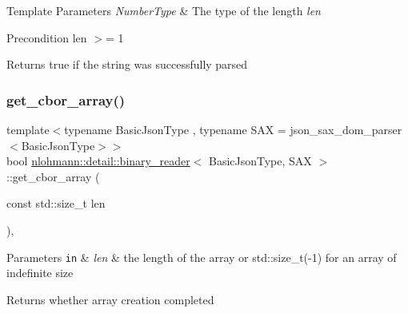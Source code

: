 \begin{DoxyTemplParams}{Template Parameters}
{\em Number\+Type} & The type of the length {\itshape len} \\
\hline
\end{DoxyTemplParams}
\begin{DoxyPrecond}{Precondition}
len $>$= 1 
\end{DoxyPrecond}
\begin{DoxyReturn}{Returns}
{\ttfamily true} if the string was successfully parsed 
\end{DoxyReturn}
\mbox{\label{classnlohmann_1_1detail_1_1binary__reader_ac3dc99d36754aa0beac506b30604a8ed}} 
\subsubsection{\texorpdfstring{get\+\_\+cbor\+\_\+array()}{get\_cbor\_array()}}
{\footnotesize\ttfamily template$<$typename Basic\+Json\+Type , typename S\+AX  = json\+\_\+sax\+\_\+dom\+\_\+parser$<$\+Basic\+Json\+Type$>$$>$ \\
bool \hyperlink{classnlohmann_1_1detail_1_1binary__reader}{nlohmann\+::detail\+::binary\+\_\+reader}$<$ Basic\+Json\+Type, S\+AX $>$\+::get\+\_\+cbor\+\_\+array (\begin{DoxyParamCaption}\item[{const std\+::size\+\_\+t}]{len }\end{DoxyParamCaption})\hspace{0.3cm}{\ttfamily [inline]}, {\ttfamily [private]}}


\begin{DoxyParams}[1]{Parameters}
\mbox{\tt in}  & {\em len} & the length of the array or std\+::size\+\_\+t(-\/1) for an array of indefinite size \\
\hline
\end{DoxyParams}
\begin{DoxyReturn}{Returns}
whether array creation completed 
\end{DoxyReturn}
\mbox{\label{classnlohmann_1_1detail_1_1binary__reader_a2fcc776cd2c7bb52bbc511e97d36978a}} 
